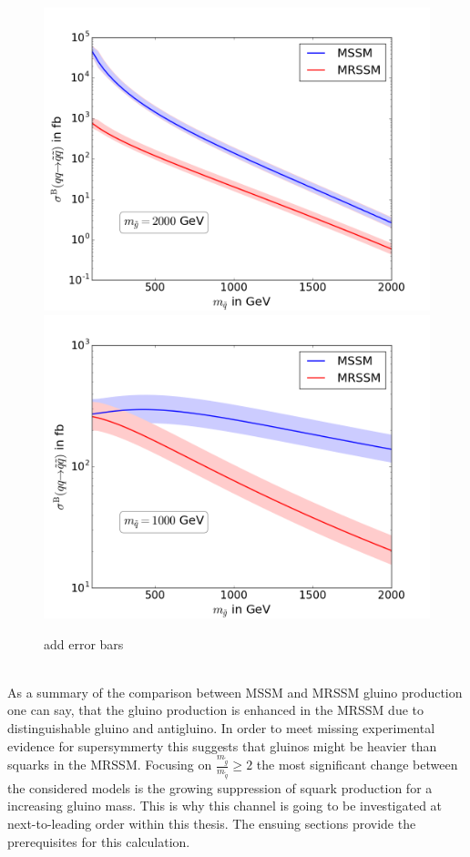 \begin{figure}[!htpb]
\begin{center}
\includegraphics[scale=.5]{figures/MSSM+MRSSM_msg=2000}
\includegraphics[scale=.5]{figures/MSSM+MRSSM_msq=1000}
\caption{add error bars}\label{fig:TreeXsection_fixed_m}
\end{center}
\end{figure}\\
As a summary of the comparison between MSSM and MRSSM gluino production one can say, that the gluino production is enhanced in the MRSSM due to distinguishable gluino and antigluino. In order to meet missing experimental evidence for supersymmerty this suggests that gluinos might be heavier than squarks in the MRSSM. Focusing on $\frac{m_{\tilde{g}}}{m_{\tilde{q}}} \geq 2$ the most significant change between the considered models is the growing suppression of squark production for a increasing gluino mass. This is why this channel is going to be investigated at next-to-leading order within this thesis. The ensuing sections provide the prerequisites for this calculation.